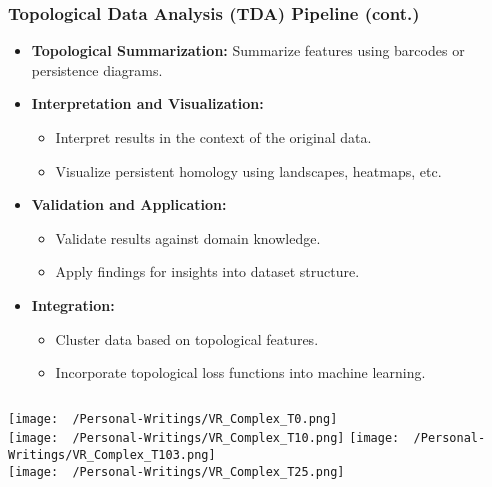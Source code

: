 \documentclass{beamer}
\begin{document}
\begin{frame}
  \frametitle{Topological Data Analysis (TDA) Pipeline (cont.)}

  \begin{itemize}
    \setlength\itemsep{1em}
    \item \textbf{Topological Summarization:} Summarize features using barcodes or persistence diagrams.
    \item \textbf{Interpretation and Visualization:}
      \begin{itemize}
        \setlength\itemsep{0.5em}
        \item Interpret results in the context of the original data.
        \item Visualize persistent homology using landscapes, heatmaps, etc.
      \end{itemize}
    \item \textbf{Validation and Application:}
      \begin{itemize}
        \setlength\itemsep{0.5em}
        \item Validate results against domain knowledge.
        \item Apply findings for insights into dataset structure.
      \end{itemize}
    \item \textbf{Integration:}
      \begin{itemize}
        \setlength\itemsep{0.5em}
        \item Cluster data based on topological features.
        \item Incorporate topological loss functions into machine learning. 
      \end{itemize}
  \end{itemize}
\end{frame}

\begin{frame}
\begin{columns}[t]
\centering
\texttt{[image: ~/Personal-Writings/VR\_Complex\_T0.png]}\\
\texttt{[image: ~/Personal-Writings/VR\_Complex\_T10.png]}
\centering
\texttt{[image: ~/Personal-Writings/VR\_Complex\_T103.png]}\\
\texttt{[image: ~/Personal-Writings/VR\_Complex\_T25.png]}
\end{columns}
\end{frame}
\end{document}
